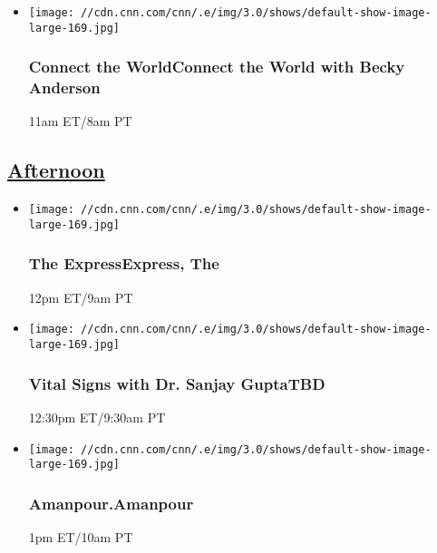 \begin{itemize}
\item
  \texttt{[image: //cdn.cnn.com/cnn/.e/img/3.0/shows/default-show-image-large-169.jpg]}

  \hypertarget{connect-the-worldconnect-the-world-with-becky-anderson--4}{%
  \subsubsection{Connect the WorldConnect the World with Becky Anderson
  }\label{connect-the-worldconnect-the-world-with-becky-anderson--4}}

  11am ET/8am PT
\end{itemize}

\hypertarget{afternoon--4}{%
\subsection{\texorpdfstring{\href{/tv/schedule/cnn/index.html}{Afternoon}~}{Afternoon~}}\label{afternoon--4}}

\begin{itemize}
\item
  \texttt{[image: //cdn.cnn.com/cnn/.e/img/3.0/shows/default-show-image-large-169.jpg]}

  \hypertarget{the-expressexpress-the--2}{%
  \subsubsection{The ExpressExpress, The
  }\label{the-expressexpress-the--2}}

  12pm ET/9am PT
\end{itemize}

\begin{itemize}
\item
  \texttt{[image: //cdn.cnn.com/cnn/.e/img/3.0/shows/default-show-image-large-169.jpg]}

  \hypertarget{vital-signs-with-dr-sanjay-guptatbd--5}{%
  \subsubsection{Vital Signs with Dr. Sanjay GuptaTBD
  }\label{vital-signs-with-dr-sanjay-guptatbd--5}}

  12:30pm ET/9:30am PT
\end{itemize}

\begin{itemize}
\item
  \texttt{[image: //cdn.cnn.com/cnn/.e/img/3.0/shows/default-show-image-large-169.jpg]}

  \hypertarget{amanpouramanpour--6}{%
  \subsubsection{Amanpour.Amanpour }\label{amanpouramanpour--6}}

  1pm ET/10am PT
\end{itemize}

